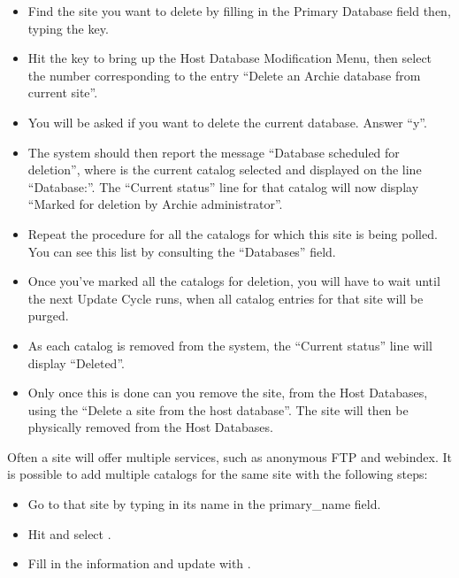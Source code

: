 \begin{itemize}
\item Find the site you want to delete by filling in the Primary Database field
then, typing the  key.

\item Hit the  key to bring up the Host Database Modification
Menu, then select the number corresponding to the entry ``Delete an Archie
database from current site''.

\item You will be asked if you want to delete the current database. Answer ``y''.

\item The system should then report the message ``Database 
scheduled for deletion'', where  is the current catalog selected
and displayed on the line ``Database:''. The ``Current status'' line for that
catalog will now display ``Marked for deletion by Archie administrator''.

\item Repeat the procedure for all the catalogs for which this site is being
polled. You can see this list by consulting the ``Databases'' field.

\item Once you've marked all the catalogs for deletion, you will have to wait
until the next Update Cycle runs, when all catalog entries for that site will
be purged.

\item As each catalog is removed from the system, the ``Current status'' line
will display ``Deleted''.

\item Only once this is done can you remove the site, from the Host Databases,
using the ``Delete a site from the host database''. The site will then be
physically removed from the Host Databases.

\end{itemize}


Often a site will offer multiple services, such as anonymous FTP and webindex.
It is possible to add multiple catalogs for the same site with
the following steps: \new

\begin{itemize}
\item Go to that site by typing in its name in the primary\_name field.
\item Hit  and select .
\item Fill in the information and update with .
\end{itemize}


